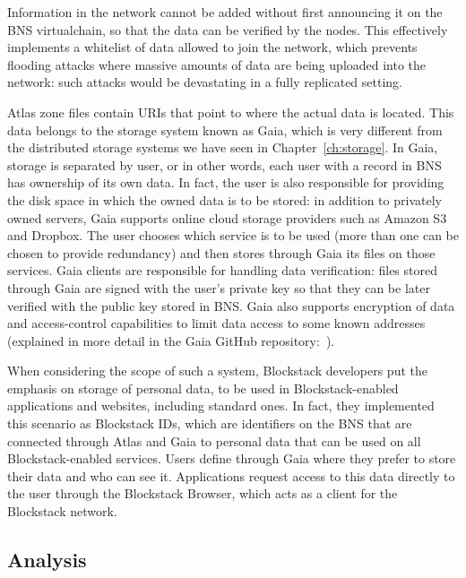 \documentclass[mscthesis]{usiinfthesis}
\begin{document}
Information in the network cannot be added without first announcing it on the BNS virtualchain, so that the data can be verified by the nodes. This effectively implements a whitelist of data allowed to join the network, which prevents flooding attacks where massive amounts of data are being uploaded into the network: such attacks would be devastating in a fully replicated setting.

Atlas zone files contain URIs that point to where the actual data is located. This data belongs to the storage system known as Gaia, which is very different from the distributed storage systems we have seen in Chapter~\ref{ch:storage}. In Gaia, storage is separated by user, or in other words, each user with a record in BNS has ownership of its own data. In fact, the user is also responsible for providing the disk space in which the owned data is to be stored: in addition to privately owned servers, Gaia supports online cloud storage providers such as Amazon S3 and Dropbox. The user chooses which service is to be used (more than one can be chosen to provide redundancy) and then stores through Gaia its files on those services. Gaia clients are responsible for handling data verification: files stored through Gaia are signed with the user's private key so that they can be later verified with the public key stored in BNS. Gaia also supports encryption of data and access-control capabilities to limit data access to some known addresses (explained in more detail in the Gaia GitHub repository:~\cite{website:gaiaaccesscontrol}).

When considering the scope of such a system, Blockstack developers put the emphasis on storage of personal data, to be used in Blockstack-enabled applications and websites, including standard ones.
In fact, they implemented this scenario as Blockstack IDs, which are identifiers on the BNS that are connected through Atlas and Gaia to personal data that can be used on all Blockstack-enabled services.
Users define through Gaia where they prefer to store their data and  who can see it. Applications request access to this data directly to the user through the Blockstack Browser, which acts as a client for the Blockstack network.

\subsection{Analysis}\label{sec:blockstackanalysis}
\end{document}
